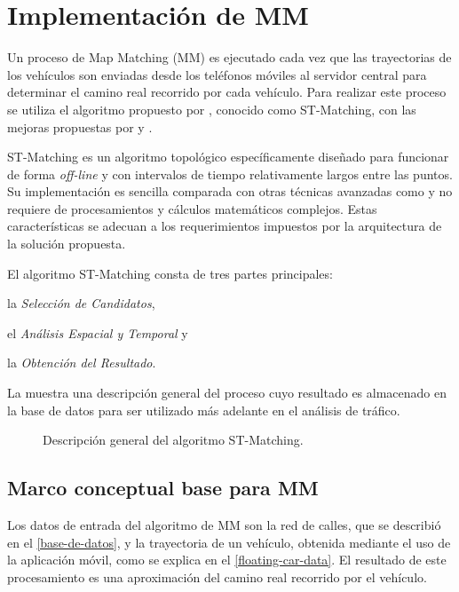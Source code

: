 \section{Implementación de MM}
\label{implementacion_mm}

Un proceso de Map Matching (MM) es ejecutado cada vez que las trayectorias de los vehículos son enviadas desde los teléfonos móviles al servidor central para determinar el camino real recorrido por cada vehículo. Para realizar este proceso se utiliza el algoritmo propuesto por \cite{lou2009map}, conocido como ST-Matching, con las mejoras propuestas por \cite{budigm2012algorithm} y \cite{sakic2012map}. 

ST-Matching es un algoritmo topológico específicamente diseñado para funcionar de forma \emph{off-line} y con intervalos de tiempo relativamente largos entre las puntos. Su implementación es sencilla comparada con otras técnicas avanzadas como \cite{quddus2006high, newson2009hidden} y no requiere de procesamientos y cálculos matemáticos complejos. Estas características se adecuan a los requerimientos impuestos por la arquitectura de la solución propuesta. 

El algoritmo ST-Matching consta de tres partes principales: \begin{enumerate*}[a)]
\item la \emph{Selección de Candidatos},
\item el \emph{Análisis Espacial y Temporal} y
\item la \emph{Obtención del Resultado}.
\end{enumerate*}
La  muestra una descripción general del proceso cuyo resultado es almacenado en la base de datos para ser utilizado más adelante en el análisis de tráfico.

\begin{figure}[h]
	\centering
	
	\caption[Descripción General de ST-Matching]{Descripción general del algoritmo ST-Matching.}
	\label{fig:st-matching} 
\end{figure}

\subsection{Marco conceptual base para MM}

Los datos de entrada del algoritmo de MM son la red de calles, que se describió en el \cref{base-de-datos}, y la trayectoria de un vehículo, obtenida mediante el uso de la aplicación móvil, como se explica en el \cref{floating-car-data}. El resultado de este procesamiento es una aproximación del camino real recorrido por el vehículo.

